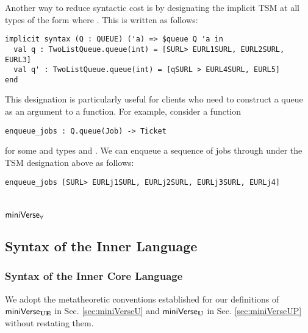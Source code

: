 Another way to reduce syntactic cost is by designating  the implicit TSM at all types of the form  where . This is written as follows:
\begin{lstlisting}[numbers=none]
implicit syntax (Q : QUEUE) ('a) => $queue Q 'a in
  val q : TwoListQueue.queue(int) = [SURL> EURL1SURL, EURL2SURL, EURL3]
  val q' : TwoListQueue.queue(int) = [qSURL > EURL4SURL, EURL5]
end
\end{lstlisting}
This designation is particularly useful for clients who need to construct a queue as an argument to a function. For example, consider a function 
\begin{lstlisting}[numbers=none]
enqueue_jobs : Q.queue(Job) -> Ticket
\end{lstlisting}
for some  and types  and . We can enqueue a sequence of jobs  through  under the TSM designation above as follows:
\begin{lstlisting}[numbers=none]
enqueue_jobs [SURL> EURLj1SURL, EURLj2SURL, EURLj3SURL, EURLj4]
\end{lstlisting}


\section{\texorpdfstring{$\mathsf{miniVerse}_\mathbf{\forall}$}{miniVerseForall}}\label{sec:miniVerseP}
\subsection{Syntax of the Inner Language}


\subsubsection{Syntax of the Inner Core Language}
We adopt the metatheoretic conventions established for our definitions of $\mathsf{miniVerse}_\textbf{UE}$ in Sec. \ref{sec:miniVerseU} and $\mathsf{miniVerse}_\textbf{U}$ in Sec. \ref{sec:miniVerseUP} without restating them. 

